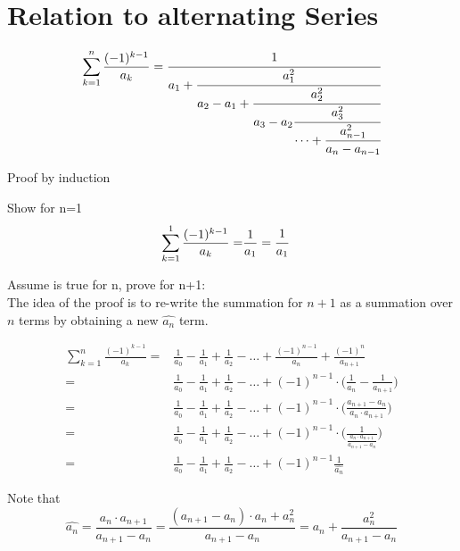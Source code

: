 \documentclass[a4paper]{article}
\begin{document}
    \section{Relation to alternating Series}\label{sec:relation-to-alternating-series}

    \begin{theorem}
        \label{relation_to_series}
        \[
        \sum_{k=1}^{n} \frac{(-1)^{k-1}}{a_k} = \cfrac{1}{a_1+\cfrac{a_{1}^{2}}{a_2 - a_1 +\cfrac{a_2^2}{a_3 - a_2
        \cfrac{a_3^2}{\cdots + \cfrac{a_{n-1}^2}{a_n - a_{n-1}}}}}}
        \]

        Proof by induction

        Show for n=1
        \begin{align*}
            \sum_{k=1}^{1} \frac{(-1)^{k-1}}{a_k} =& \frac{1}{a_1} = \cfrac{1}{a_1}
        \end{align*}

        Assume is true for n, prove for n+1:
        \\
        The idea of the proof is to re-write the summation for $n+1$ as a summation over $n$ terms by obtaining a new $\widehat{a_n}$ term.

        \begin{align*}
            \sum_{k=1}^{n} \frac{(-1)^{k-1}}{a_k} =& \frac{1}{a_0} - \frac{1}{a_1} + \frac{1}{a_2} - \dots + \frac{(-1)^{n-1}}{a_{n}} + \frac{(-1)^{n}}{a_{n+1}}
            \\
            =& \frac{1}{a_0} - \frac{1}{a_1} + \frac{1}{a_2} - \dots + (-1)^{n-1} \cdot \Big( \frac{1}{a_{n}} - \frac{1}{a_{n+1}} \Big)
            \\
            =& \frac{1}{a_0} - \frac{1}{a_1} + \frac{1}{a_2} - \dots + (-1)^{n-1} \cdot \Big( \frac{a_{n+1} - a_{n}}{a_{n}\cdot a_{n+1}} \Big)
            \\
            =& \frac{1}{a_0} - \frac{1}{a_1} + \frac{1}{a_2} - \dots + (-1)^{n-1} \cdot \Big( \frac{1}{\frac{a_{n}\cdot a_{n+1}}{a_{n+1} - a_{n}}}  \Big)
            \\
            =& \frac{1}{a_0} - \frac{1}{a_1} + \frac{1}{a_2} - \dots + (-1)^{n-1} \frac{1}{\widehat{a_n}}
        \end{align*}

        Note that
        \begin{equation*}
            \widehat{a_n}
            =
            \frac{a_{n}\cdot a_{n+1}}{a_{n+1} - a_{n}} =
            \frac{(a_{n+1} - a_n)\cdot a_{n} + a_n^2}{a_{n+1} - a_{n}} = a_{n} + \frac{a_n^2}{a_{n+1} - a_{n}}
        \end{equation*}


\end{theorem}
\end{document}
